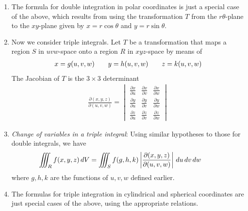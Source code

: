 \documentclass[10pt]{article}
\begin{document}
\begin{multicols*}{2}
\begin{enumerate}
\begin{enumerate}
        \item The formula for double integration in polar coordinates is just a special case of the above, which results from using the transformation $T$ from the $r\theta$-plane to the $xy$-plane given by $x=r\cos{\theta}$ and $y=r\sin{\theta}$.
        \item Now we consider triple integrals. Let $T$ be a transformation that maps a region $S$ in $uvw$-space onto a region $R$ in $xyz$-space by means of 
        \begin{align*}
            x=g(u,v,w) \hspace{7mm} y=h(u,v,w) \hspace{7mm} z=k(u,v,w)
        \end{align*}
        The Jacobian of $T$ is the $3 \times 3$ determinant
        \begin{align*}
            \frac{\partial (x,y,z)}{\partial (u,v,w)} = 
            \begin{vmatrix}
                \frac{\partial x}{\partial u} & \frac{\partial x}{\partial v} & \frac{\partial x}{\partial w} \\[8pt]
                \frac{\partial y}{\partial u} & \frac{\partial y}{\partial v} & \frac{\partial y}{\partial w} \\[8pt]
                \frac{\partial z}{\partial u} & \frac{\partial z}{\partial v} & \frac{\partial z}{\partial w} 
            \end{vmatrix}
        \end{align*}
        \item \textit{Change of variables in a triple integral}: Using similar hypotheses to those for double integrals, we have
        \begin{align*}
        \hspace{-5mm}
            &\iiint_R f(x,y,z) \,dV = \iiint_S f(g, h, k) \left| \frac{\partial (x,y,z)}{\partial (u,v,w)} \right| \,du \,dv \,dw
        \end{align*}
        where $g,h,k$ are the functions of $u,v,w$ defined earlier.
        \item The formulas for triple integration in cylindrical and spherical coordinates are just special cases of the above, using the appropriate relations. 
    \end{enumerate}
\end{enumerate}


\end{multicols*}
\end{document}
